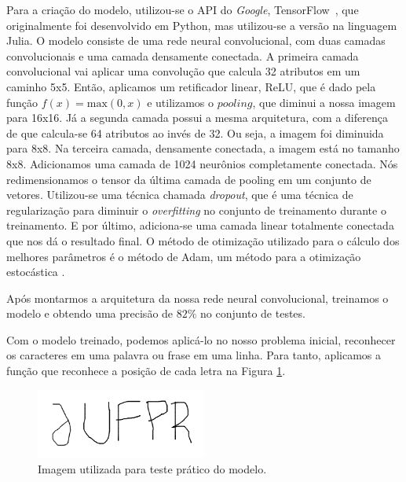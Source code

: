 \documentclass[
	12pt,				%
    oneside,			%
	a4paper,			%
	english,			%
	french,				%
	spanish,			%
	brazil,				%
	]{abntex2}
\begin{document}
        Para a criação do modelo, utilizou-se o API do \emph{Google}, TensorFlow~\cite{tensorflow2015}, que originalmente foi desenvolvido em Python, mas utilizou-se a versão na linguagem Julia.
        O modelo consiste de uma rede neural convolucional, com duas camadas convolucionais e uma camada densamente conectada.
        A primeira camada convolucional vai aplicar uma convolução que calcula 32 atributos em um caminho 5x5.
        Então, aplicamos um retificador linear, ReLU, que é dado pela função $f(x) = \text{max}(0,x)$ e utilizamos o $pooling$, que diminui a nossa imagem para 16x16.
        Já a segunda camada possui a mesma arquitetura, com a diferença de que calcula-se 64 atributos ao invés de 32. Ou seja, a imagem foi diminuida para 8x8.
        Na terceira camada, densamente conectada, a imagem está no tamanho 8x8. Adicionamos uma camada de 1024 neurônios completamente conectada. Nós redimensionamos o tensor da última camada de pooling em um conjunto de vetores.
        Utilizou-se uma técnica chamada \emph{dropout}, que é uma técnica de regularização para diminuir o \emph{overfitting} no conjunto de treinamento durante o treinamento. E por último, adiciona-se uma camada linear totalmente conectada que nos dá o resultado final.
        O método de otimização utilizado para o cálculo dos melhores parâmetros é o método de Adam, um método para a otimização estocástica \cite{adam}.

        Após montarmos a arquitetura da nossa rede neural convolucional, treinamos o modelo e obtendo uma precisão de $82\%$ no conjunto de testes.

        Com o modelo treinado, podemos aplicá-lo no nosso problema inicial, reconhecer os caracteres em uma palavra ou frase em uma linha. Para tanto, aplicamos a função que reconhece a posição de cada letra na Figura \ref{fig:parufpr}.

        \begin{figure}[bht]
            \centering
            \includegraphics[width=0.5\textwidth]{TesteUFPR.png}
            \caption{Imagem utilizada para teste prático do modelo.}
            \label{fig:parufpr}
        \end{figure}
\end{document}
